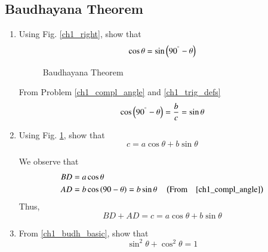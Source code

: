 \subsection{Baudhayana Theorem}
\renewcommand{\theequation}{\theenumi}
\begin{enumerate}[label=\arabic*.,ref=\thesubsection.\theenumi]



\item 	Using Fig. \ref{ch1_right}, show that
	\begin{equation}
	\cos \theta = \sin \left(90^{\degree} - \theta\right)
	\end{equation}


\begin{figure}[!ht]
	\begin{center}
		
		\resizebox{\columnwidth}{!}{}
	\end{center}
	\caption{Baudhayana Theorem}
	\label{ch1_budh_triangle}	
\end{figure}


\solution From Problem \ref{ch1_compl_angle} and  \eqref{ch1_trig_defs}
%
\begin{equation}
	\cos \left(90^{\degree}-\theta\right) = \frac{b}{c} = \sin \theta
\end{equation}
%
\item
Using Fig. \ref{ch1_budh_triangle}, show that 
%
\begin{equation}
\label{ch1_budh_basic}
c = a \cos \theta + b \sin \theta
\end{equation}
%

\solution We observe that
%
\begin{align}
BD &= a \cos \theta \\
AD &= b \cos\left(90-\theta\right) = b \sin \theta \quad \left(\text{From} \quad \eqref{ch1_compl_angle}\right)
\end{align}
%
Thus,
\begin{equation}
BD + AD = c = a \cos \theta + b \sin \theta
\end{equation}
\item
From \eqref{ch1_budh_basic}, show that
%
\begin{equation}
%
\label{eq:tri_sin_cos_id}
\sin ^2 \theta + \cos ^2 \theta = 1
\end{equation}



\end{enumerate}
